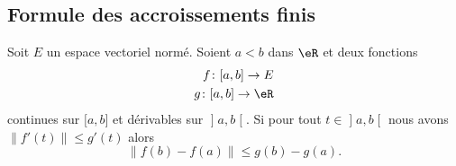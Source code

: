 \subsection{Formule des accroissements finis}

\begin{proposition} \label{PropDQLhSoy}
    Soit \( E\) un espace vectoriel normé. Soient \( a<b\) dans \( \eR\) et deux fonctions
    \begin{subequations}
        \begin{align}
            f\colon \mathopen[ a , b \mathclose]\to E\\
            g\colon \mathopen[ a , b \mathclose]\to \eR
        \end{align}
    \end{subequations}
    continues sur \( \mathopen[ a , b \mathclose]\) et dérivables sur \( \mathopen] a , b \mathclose[\). Si pour tout \( t\in\mathopen] a , b \mathclose[\) nous avons \( \| f'(t) \|\leq g'(t)\) alors
        \begin{equation}
            \| f(b)-f(a) \|\leq g(b)-g(a).
        \end{equation}
\end{proposition}

